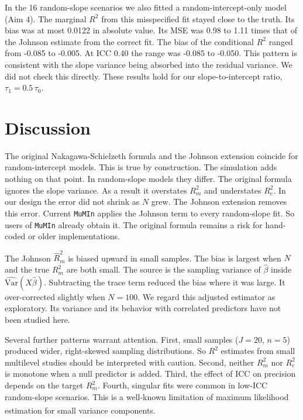 \documentclass[
  11pt,
]{article}
\begin{document}
In the 16 random-slope scenarios we also fitted a
random-intercept-only model (Aim 4). The marginal \(R^2\) from this
misspecified fit stayed close to the truth. Its bias was at most
0.0122 in absolute value. Its MSE was
0.98 to
1.11 times that of the Johnson
estimate from the correct fit. The bias of the conditional \(R^2\)
ranged from -0.085 to
-0.005. At ICC 0.40 the range was
-0.085 to
-0.050. This pattern is
consistent with the slope variance being absorbed into the
residual variance. We did not check this directly. These
results hold for our slope-to-intercept ratio,
\(\tau_1 = 0.5\,\tau_0\).

\section{Discussion}\label{discussion}

The original Nakagawa-Schielzeth formula and the Johnson
extension coincide for random-intercept models. This is true by
construction. The simulation adds nothing on that point. In
random-slope models they differ. The original formula ignores the
slope variance. As a result it overstates \(R^2_m\) and understates
\(R^2_c\). In our design the error did not shrink as \(N\) grew. The
Johnson extension removes this error. Current \texttt{MuMIn} applies the
Johnson term to every random-slope fit. So users of \texttt{MuMIn}
already obtain it. The original formula remains a risk for hand-coded or
older implementations.

The Johnson \(\hat R^2_m\) is biased upward in small samples. The
bias is largest when \(N\) and the true \(R^2_m\) are both small. The
source is the sampling variance of \(\hat\beta\) inside
\(\widehat{\text{Var}}(X\hat\beta)\). Subtracting the trace term
reduced the bias where it was large. It over-corrected slightly
when \(N = 100\). We regard this adjusted estimator as exploratory.
Its variance and its behavior with
correlated predictors have not been studied here.

Several further patterns warrant attention. First, small samples
(\(J = 20\), \(n = 5\)) produced wider, right-skewed sampling
distributions. So \(R^2\) estimates from small multilevel studies
should be interpreted with caution. Second, neither \(R^2_m\) nor
\(R^2_c\) is monotone when a null predictor is added. Third, the
effect of ICC on precision depends on the target \(R^2_m\). Fourth,
singular fits were common in low-ICC random-slope scenarios. This
is a well-known limitation of maximum likelihood estimation for
small variance components\textsuperscript{}.
\end{document}
